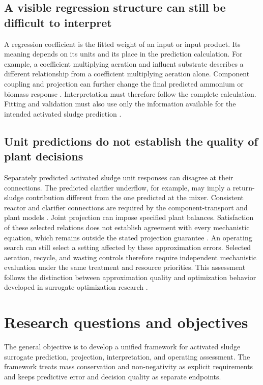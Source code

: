 \subsection{A visible regression structure can still be difficult to interpret}

A regression coefficient is the fitted weight of an input or input product. Its meaning depends on its units and its place in the prediction calculation. For example, a coefficient multiplying aeration and influent substrate describes a different relationship from a coefficient multiplying aeration alone. Component coupling and projection can further change the final predicted ammonium or biomass response \citep{Selerio2026}. Interpretation must therefore follow the complete calculation. Fitting and validation must also use only the information available for the intended activated sludge prediction \citep{Kaufman2012}.

\subsection{Unit predictions do not establish the quality of plant decisions}

Separately predicted activated sludge unit responses can disagree at their connections. The predicted clarifier underflow, for example, may imply a return-sludge contribution different from the one predicted at the mixer. Consistent reactor and clarifier connections are required by the component-transport and plant models \citep{JeppssonDiehl1996,Alex2008}. Joint projection can impose specified plant balances. Satisfaction of these selected relations does not establish agreement with every mechanistic equation, which remains outside the stated projection guarantee \citep{KircherVotsmeier2025,Selerio2026}. An operating search can still select a setting affected by these approximation errors. Selected aeration, recycle, and wasting controls therefore require independent mechanistic evaluation under the same treatment and resource priorities. This assessment follows the distinction between approximation quality and optimization behavior developed in surrogate optimization research \citep{Alexandrov1998,Pedrozo2025}.

\section{Research questions and objectives}

The general objective is to develop a unified framework for activated sludge surrogate prediction, projection, interpretation, and operating assessment. The framework treats mass conservation and non-negativity as explicit requirements and keeps predictive error and decision quality as separate endpoints.

